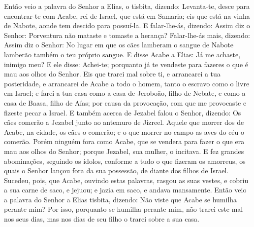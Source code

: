 Então veio a palavra do Senhor a Elias, o tisbita, dizendo:
Levanta-te, desce para encontrar-te com Acabe, rei de Israel,
que está em Samaria; eis que está na vinha de Nabote, aonde tem
descido para possuí-la. E falar-lhe-ás, dizendo: Assim diz o
Senhor: Porventura não mataste e tomaste a herança? Falar-lhe-ás
mais, dizendo: Assim diz o Senhor: No lugar em que os cães lamberam
o sangue de Nabote lamberão também o teu próprio sangue. E
disse Acabe a Elias: Já me achaste, inimigo meu? E ele disse:
Achei-te; porquanto já te vendeste para fazeres o que é mau aos
olhos do Senhor. Eis que trarei mal sobre ti, e arrancarei a
tua posteridade, e arrancarei de Acabe a todo o homem, tanto o
escravo como o livre em Israel; e farei a tua casa como a
casa de Jeroboão, filho de Nebate, e como a casa de Baasa, filho de
Aías; por causa da provocação, com que me provocaste e fizeste pecar
a Israel. E também acerca de Jezabel falou o Senhor, dizendo:
Os cães comerão a Jezabel junto ao antemuro de Jizreel.
Aquele que morrer dos de Acabe, na cidade, os cães o comerão;
e o que morrer no campo as aves do céu o comerão. Porém
ninguém fora como Acabe, que se vendera para fazer o que era mau aos
olhos do Senhor; porque Jezabel, sua mulher, o incitava. E
fez grandes abominações, seguindo os ídolos, conforme a tudo o que
fizeram os amorreus, os quais o Senhor lançou fora da sua possessão,
de diante dos filhos de Israel. Sucedeu, pois, que Acabe,
ouvindo estas palavras, rasgou as suas vestes, e cobriu a sua carne
de saco, e jejuou; e jazia em saco, e andava mansamente.
Então veio a palavra do Senhor a Elias tisbita, dizendo:
Não viste que Acabe se humilha perante mim? Por isso,
porquanto se humilha perante mim, não trarei este mal nos seus dias,
mas nos dias de seu filho o trarei sobre a sua casa.

\medskip

